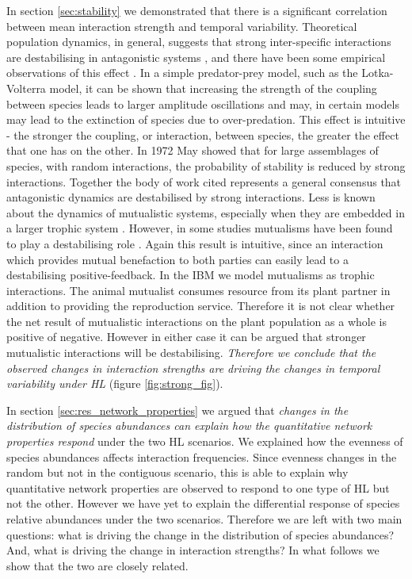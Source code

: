 In section \ref{sec:stability} we demonstrated that there is a significant correlation between mean interaction strength and temporal variability. Theoretical population dynamics, in general, suggests that strong inter-specific interactions are destabilising in antagonistic systems \cite{may1972will,mccann1998weak,neutel2002stability,kokkoris1999patterns,coyte2015ecology}, and there have been some empirical observations of this effect \cite{o2009perturbations}. In a simple predator-prey model, such as the Lotka-Volterra model, it can be shown that increasing the strength of the coupling between species leads to larger amplitude oscillations and may, in certain models may lead to the extinction of species due to over-predation. This effect is intuitive - the stronger the coupling, or interaction, between species, the greater the effect that one has on the other. In 1972 May showed \cite{may1972will} that for large assemblages of species, with random interactions, the probability of stability is reduced by strong interactions. Together the body of work cited represents a general consensus that antagonistic dynamics are destabilised by strong interactions. Less is known about the dynamics of mutualistic systems, especially when they are embedded in a larger trophic system \cite{lurgi2015effects,sauve2014structure}. However, in some studies mutualisms have been found to play a destabilising role \cite{coyte2015ecology,may1981patterns}. Again this result is intuitive, since an interaction which provides mutual benefaction to both parties can easily lead to a destabilising positive-feedback. In the IBM we model mutualisms as trophic interactions. The animal mutualist consumes resource from its plant partner in addition to providing the reproduction service. Therefore it is not clear whether the net result of mutualistic interactions on the plant population as a whole is positive of negative. However in either case it can be argued that stronger mutualistic interactions will be destabilising. \emph{Therefore we conclude that the observed changes in interaction strengths are driving the changes in temporal variability under HL} (figure \ref{fig:strong_fig}). 

In section \ref{sec:res_network_properties} we argued that \emph{changes in the distribution of species abundances can explain how the quantitative network properties respond} under the two HL scenarios. We explained how the evenness of species abundances affects interaction frequencies. Since evenness changes in the random but not in the contiguous scenario, this is able to explain why quantitative network properties are observed to respond to one type of HL but not the other. However we have yet to explain the differential response of species relative abundances under the two scenarios. Therefore we are left with two main questions: what is driving the change in the distribution of species abundances? And, what is driving the change in interaction strengths? In what follows we show that the two are closely related.  

